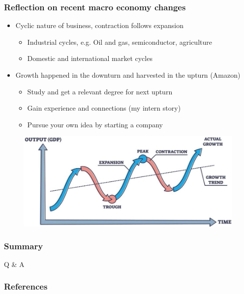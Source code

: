 \documentclass[aspectratio=169,xcolor=x11names,table]{beamer}
\begin{document}
\begin{frame}
	\frametitle{Reflection on recent macro economy changes}
	\begin{itemize}
		\item Cyclic nature of business, contraction follows expansion
			\begin{itemize}
				\item Industrial cycles, e.g. Oil and gas, semiconductor, agriculture
				\item Domestic and international market cycles
			\end{itemize}
		\item Growth happened in the downturn and harvested in the upturn (Amazon)
			\begin{itemize}
				\item Study and get a relevant degree for next upturn
				\item Gain experience and connections (my intern story)
				\item Pursue your own idea by starting a company
			\end{itemize}
	\end{itemize}
	\vfill
	\begin{figure}
		\centering
		\includegraphics[width=0.6\linewidth]{business_cycles}
	\end{figure}
\end{frame}


\begin{frame}
	\frametitle{Summary}
	\tableofcontents
\end{frame}

\begin{frame}
	\center
	\Huge Q \& A
\end{frame}

\begin{frame}[t,allowframebreaks]
	\frametitle{References}
	\tiny
	\printbibliography
\end{frame}
\end{document}
